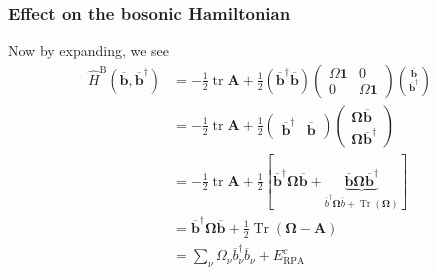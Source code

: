 \subsubsection{Effect on the bosonic Hamiltonian}
Now by expanding, we see
\begin{align}
\hat{H}^{\mathrm{B}}\left(\overline{\mathbf{b}},
\overline{\mathbf{b}}^{\dagger}\right)&=-\frac{1}{2} \operatorname{tr} \mathbf{A}+\frac{1}{2}\left(\overline{\mathbf{b}}^{\dagger} \overline{\mathbf{b}}\right)\left(\begin{array}{cc}\Omega \mathbf{1} & 0 \\
0 & \Omega \mathbf{1}
\end{array}\right)\binom{\overline{\mathbf{b}}}{\overline{\mathbf{b}}^{\dagger}} \\
&=-\frac{1}{2} \operatorname{tr} \mathbf{A}+ \frac{1}{2}\begin{pmatrix}
\overline{\mathbf{b}}^{\dagger} & \overline{\mathbf{b}}\end{pmatrix}
\begin{pmatrix}
\bm{\Omega} \overline{\mathbf{b}} \\
\bm{\Omega} \overline{\mathbf{b}}^{\dagger}
\end{pmatrix}
\\
&=-\frac{1}{2} \operatorname{tr} \mathbf{A}+\frac{1}{2}\left[\overline{\mathbf{b}}^{\dagger} \bm{\Omega} \overline{\mathbf{b}} + \underbrace{\overline{\mathbf{b}} \bm{\Omega} \overline{\mathbf{b}}^{\dagger}}_{\overline{b}^\dagger \bm{\Omega} \overline{b} + \operatorname{Tr}\left(\bm{\Omega}\right)}\right] \\
&=\overline{\mathbf{b}}^{\dagger} \bm{\Omega} \overline{\mathbf{b}} + \frac{1}{2}\operatorname{Tr}\left(\bm{\Omega} - \mathbf{A}\right) \\
&=\sum_{\nu} \Omega_\nu \overline{b}_\nu^{\dagger} \overline{b}_\nu + E_{\mathrm{RPA}}^c
\end{align}
